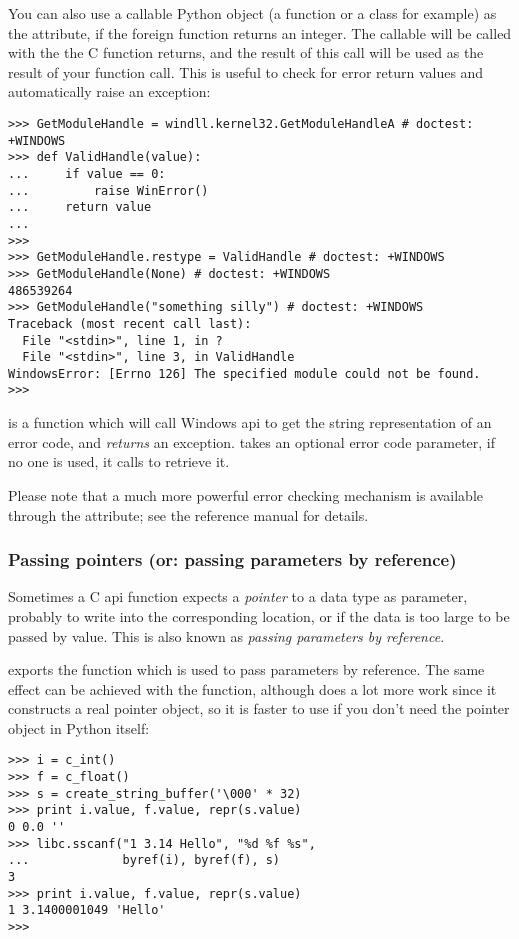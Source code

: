 You can also use a callable Python object (a function or a class for
example) as the  attribute, if the foreign function returns
an integer.  The callable will be called with the  the C
function returns, and the result of this call will be used as the
result of your function call. This is useful to check for error return
values and automatically raise an exception:
\begin{verbatim}
>>> GetModuleHandle = windll.kernel32.GetModuleHandleA # doctest: +WINDOWS
>>> def ValidHandle(value):
...     if value == 0:
...         raise WinError()
...     return value
...
>>>
>>> GetModuleHandle.restype = ValidHandle # doctest: +WINDOWS
>>> GetModuleHandle(None) # doctest: +WINDOWS
486539264
>>> GetModuleHandle("something silly") # doctest: +WINDOWS
Traceback (most recent call last):
  File "<stdin>", line 1, in ?
  File "<stdin>", line 3, in ValidHandle
WindowsError: [Errno 126] The specified module could not be found.
>>>
\end{verbatim}

 is a function which will call Windows 
api to get the string representation of an error code, and \emph{returns}
an exception.   takes an optional error code parameter, if
no one is used, it calls  to retrieve it.

Please note that a much more powerful error checking mechanism is
available through the  attribute; see the reference manual
for details.


\subsubsection{Passing pointers (or: passing parameters by reference)\label{ctypes-passing-pointers}}

Sometimes a C api function expects a \emph{pointer} to a data type as
parameter, probably to write into the corresponding location, or if
the data is too large to be passed by value. This is also known as
\emph{passing parameters by reference}.

 exports the  function which is used to pass
parameters by reference.  The same effect can be achieved with the
 function, although  does a lot more work since
it constructs a real pointer object, so it is faster to use 
if you don't need the pointer object in Python itself:
\begin{verbatim}
>>> i = c_int()
>>> f = c_float()
>>> s = create_string_buffer('\000' * 32)
>>> print i.value, f.value, repr(s.value)
0 0.0 ''
>>> libc.sscanf("1 3.14 Hello", "%d %f %s",
...             byref(i), byref(f), s)
3
>>> print i.value, f.value, repr(s.value)
1 3.1400001049 'Hello'
>>>
\end{verbatim}


